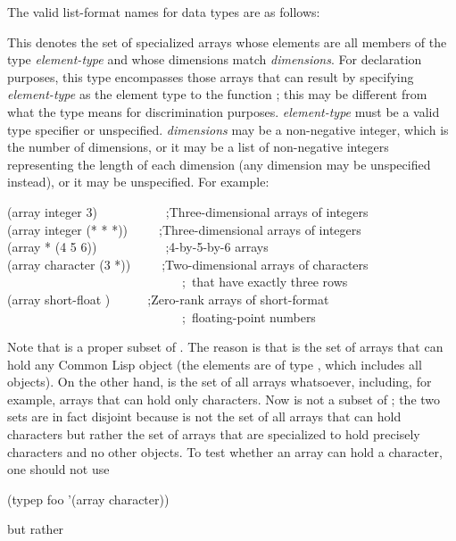 The valid list-format names for data types are as follows:
\begin{flushdesc}
\item[\cd{(array {\it element-type} {\it dimensions})}]
This denotes the set
of specialized arrays
whose elements are all members of the type {\it element-type}
and whose dimensions match {\it dimensions}.
For declaration purposes, this type encompasses those arrays
that can result by specifying {\it element-type} as the element type
to the function ; this may be different
from what the type means for discrimination purposes.
{\it element-type} must be a valid type specifier or unspecified.
{\it dimensions} may be a non-negative integer, which is the number
of dimensions, or it may be a list of non-negative integers
representing the length of each dimension (any dimension
may be unspecified instead), or it may be unspecified.
For example:
\begin{lisp}
(array integer 3)~~~~~~~~~~~;{\rm Three-dimensional arrays of integers} \\
(array integer (* * *))~~~~~;{\rm Three-dimensional arrays of integers} \\
(array * (4 5 6))~~~~~~~~~~~;{\rm 4-by-5-by-6 arrays} \\
(array character (3 *))~~~~~;{\rm Two-dimensional arrays of characters} \\
~~~~~~~~~~~~~~~~~~~~~~~~~~~~;~{\rm that have exactly three rows} \\
(array short-float {\empty})~~~~~~;{\rm Zero-rank arrays of short-format} \\
~~~~~~~~~~~~~~~~~~~~~~~~~~~~;~{\rm floating-point numbers}
\end{lisp}
Note that  is a proper subset of .
The reason is that  is the set of arrays that can
hold any Common Lisp object (the elements are of type ,
which includes all objects).  On the other hand, 
is the set of all arrays whatsoever, including, for example,
arrays that can hold only characters.  Now
 is not a subset of ; the two sets
are in fact disjoint because  is not the
set of all arrays that can hold characters but rather the set of
arrays that are specialized to hold precisely characters and no
other objects.  To test whether an array  can hold a character,
one should not use
\begin{lisp}
(typep foo '(array character))
\end{lisp}
but rather

\end{flushdesc}

